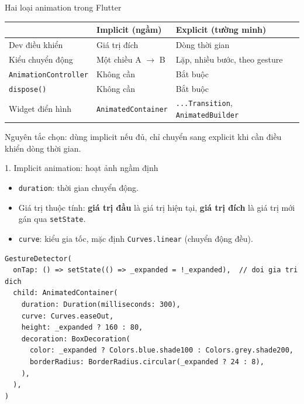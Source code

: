 \documentclass[aspectratio=169,10pt]{beamer}
\begin{document}
\begin{frame}{Hai loại animation trong Flutter}
  \begin{center}
  \begin{tabular}{lll}
    \toprule
     & \textbf{Implicit (ngầm)} & \textbf{Explicit (tường minh)} \\
    \midrule
    Dev điều khiển & Giá trị đích & Dòng thời gian \\
    Kiểu chuyển động & Một chiều A $\rightarrow$ B & Lặp, nhiều bước, theo gesture \\
    \texttt{AnimationController} & Không cần & Bắt buộc \\
    \texttt{dispose()} & Không cần & Bắt buộc \\
    Widget điển hình & \texttt{AnimatedContainer} & \texttt{...Transition}, \texttt{AnimatedBuilder} \\
    \bottomrule
  \end{tabular}
  \end{center}
  \vspace{0.3cm}
  Nguyên tắc chọn: dùng implicit nếu đủ, chỉ chuyển sang explicit khi cần điều khiển dòng thời gian.
\end{frame}



\begin{frame}[fragile]{1. Implicit animation: hoạt ảnh ngầm định}
  \begin{itemize}
    \item \texttt{duration}: thời gian chuyển động.
    \item Giá trị thuộc tính: \textbf{giá trị đầu} là giá trị hiện tại,
          \textbf{giá trị đích} là giá trị mới gán qua \texttt{setState}.
    \item \texttt{curve}: kiểu gia tốc, mặc định \texttt{Curves.linear} (chuyển động đều).
  \end{itemize}
\begin{lstlisting}[frame=single,
  basicstyle=\fontfamily{phv}\selectfont\footnotesize]
GestureDetector(
  onTap: () => setState(() => _expanded = !_expanded),  // doi gia tri dich
  child: AnimatedContainer(
    duration: Duration(milliseconds: 300),
    curve: Curves.easeOut,
    height: _expanded ? 160 : 80,
    decoration: BoxDecoration(
      color: _expanded ? Colors.blue.shade100 : Colors.grey.shade200,
      borderRadius: BorderRadius.circular(_expanded ? 24 : 8),
    ),
  ),
)
\end{lstlisting}
\end{frame}
\end{document}
